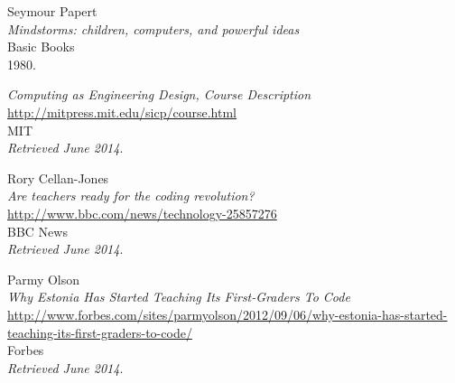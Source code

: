\begin{thebibliography}{99}
  Seymour Papert \\
  \emph{Mindstorms: children, computers, and powerful ideas} \\
  Basic Books \\
  1980.

  \emph{Computing as Engineering Design, Course Description} \\
  \url{http://mitpress.mit.edu/sicp/course.html} \\
  MIT \\
  \emph{Retrieved June 2014}.

  Rory Cellan-Jones \\
  \emph{Are teachers ready for the coding revolution?} \\
  \url{http://www.bbc.com/news/technology-25857276} \\
  BBC News \\
  \emph{Retrieved June 2014}.

  Parmy Olson \\
  \emph{Why Estonia Has Started Teaching Its First-Graders To Code} \\
  \url{http://www.forbes.com/sites/parmyolson/2012/09/06/why-estonia-has-started-teaching-its-first-graders-to-code/} \\
  Forbes \\
  \emph{Retrieved June 2014}.

\end{thebibliography}
